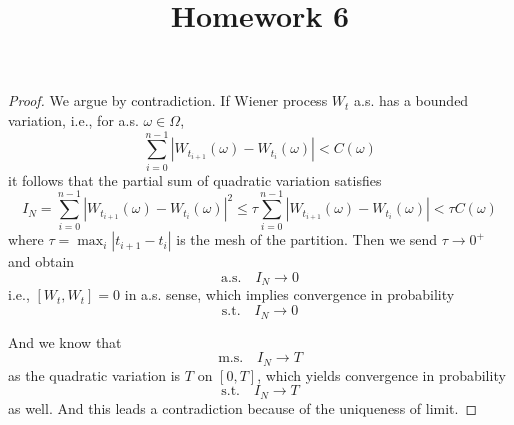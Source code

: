 \documentclass{homework}
\title{Homework 6}
\begin{document}
    \maketitle    

    \problem
    \begin{proof}
        We argue by contradiction. If Wiener process
        $W_t$ a.s. has a bounded variation, i.e.,
        for a.s. $\omega\in\Omega$,
        \[\sum_{i=0}^{n-1}
        |W_{t_{i+1}}(\omega)-W_{t_i}(\omega)|<C(\omega)\]
        it follows that the partial sum of quadratic variation
        satisfies
        \[I_N=\sum_{i=0}^{n-1}
        |W_{t_{i+1}}(\omega)-W_{t_i}(\omega)|^2\leq
        \tau\sum_{i=0}^{n-1}|W_{t_{i+1}}(\omega)-W_{t_i}(\omega)|
        <\tau C(\omega)\]
        where $\tau=\max_i|t_{i+1}-t_i|$ is the mesh of the
        partition.
        Then we send $\tau\to 0^+$ and obtain
        \[\text{a.s.}\quad I_N\to 0\]
        i.e., $[W_t,W_t]=0$ in a.s. sense, which implies
        convergence in probability
        \[\text{s.t.}\quad I_N\to 0\]
        
        And we know that
        \[\text{m.s.}\quad I_N\to T\]
        as the quadratic variation is $T$ on $[0,T]$,
        which yields convergence in probability
        \[\text{s.t.}\quad I_N\to T\]
        as well. And this leads a contradiction because of the
        uniqueness of limit.
    \end{proof}

    \problem
\end{document}
